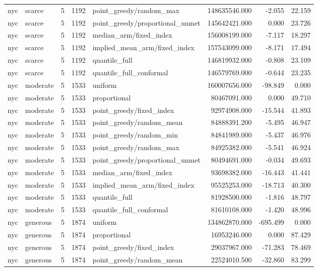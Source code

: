 \begin{tabular}{llrrlrrr}
nyc & scarce & 5 & 1192 & point\_greedy/random\_max & 148635546.000 & -2.055 & 22.159 \\
nyc & scarce & 5 & 1192 & point\_greedy/proportional\_unmet & 145642421.000 & 0.000 & 23.726 \\
nyc & scarce & 5 & 1192 & median\_arm/fixed\_index & 156008199.000 & -7.117 & 18.297 \\
nyc & scarce & 5 & 1192 & implied\_mean\_arm/fixed\_index & 157543099.000 & -8.171 & 17.494 \\
nyc & scarce & 5 & 1192 & quantile\_full & 146819932.000 & -0.808 & 23.109 \\
nyc & scarce & 5 & 1192 & quantile\_full\_conformal & 146579769.000 & -0.644 & 23.235 \\
nyc & moderate & 5 & 1533 & uniform & 160007656.000 & -98.849 & 0.000 \\
nyc & moderate & 5 & 1533 & proportional & 80467091.000 & 0.000 & 49.710 \\
nyc & moderate & 5 & 1533 & point\_greedy/fixed\_index & 92974908.000 & -15.544 & 41.893 \\
nyc & moderate & 5 & 1533 & point\_greedy/random\_mean & 84888391.200 & -5.495 & 46.947 \\
nyc & moderate & 5 & 1533 & point\_greedy/random\_min & 84841989.000 & -5.437 & 46.976 \\
nyc & moderate & 5 & 1533 & point\_greedy/random\_max & 84925382.000 & -5.541 & 46.924 \\
nyc & moderate & 5 & 1533 & point\_greedy/proportional\_unmet & 80494691.000 & -0.034 & 49.693 \\
nyc & moderate & 5 & 1533 & median\_arm/fixed\_index & 93698382.000 & -16.443 & 41.441 \\
nyc & moderate & 5 & 1533 & implied\_mean\_arm/fixed\_index & 95525253.000 & -18.713 & 40.300 \\
nyc & moderate & 5 & 1533 & quantile\_full & 81928500.000 & -1.816 & 48.797 \\
nyc & moderate & 5 & 1533 & quantile\_full\_conformal & 81610108.000 & -1.420 & 48.996 \\
nyc & generous & 5 & 1874 & uniform & 134862870.000 & -695.499 & 0.000 \\
nyc & generous & 5 & 1874 & proportional & 16953246.000 & 0.000 & 87.429 \\
nyc & generous & 5 & 1874 & point\_greedy/fixed\_index & 29037967.000 & -71.283 & 78.469 \\
nyc & generous & 5 & 1874 & point\_greedy/random\_mean & 22524010.500 & -32.860 & 83.299 \\

\end{tabular}

